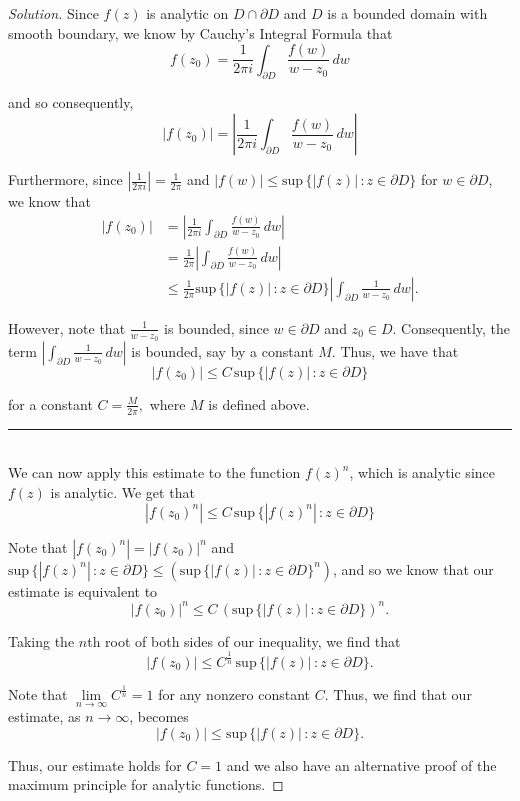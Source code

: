 \documentclass[11pt]{article}
\newenvironment{solution}
  {\renewcommand\qedsymbol{$\blacksquare$}\begin{proof}[Solution]}
  {\end{proof}}
\theoremstyle{definition}
\begin{document}
\begin{solution}
Since $f(z)$ is analytic on $D \cap \partial D$ and $D$ is a bounded domain with smooth boundary, we know by Cauchy's Integral Formula that
\[ f(z_0) = \frac{1}{2\pi i} \int_{\partial D} \frac{f(w)}{w-z_0} \, dw\]

and so consequently, 
\[ |f(z_0)| = \left|\frac{1}{2\pi i} \int_{\partial D} \frac{f(w)}{w-z_0} \, dw \right| \]

Furthermore, since $\left| \frac{1}{2\pi i} \right| = \frac{1}{2\pi}$ and $|f(w)| \leq \mathrm{sup} \, \{|f(z)| \, : z \in \partial D\}$ for $w \in \partial D$, we know that
\begin{align*} |f(z_0)| &= \left|\frac{1}{2\pi i} \int_{\partial D} \frac{f(w)}{w-z_0} \, dw \right| \\
&= \frac{1}{2\pi} \left|\int_{\partial D} \frac{f(w)}{w-z_0} \, dw \right| \\
&\leq \frac{1}{2\pi} \mathrm{sup} \, \{|f(z)| \, : z \in \partial D\} \left|\int_{\partial D} \frac{1}{w-z_0} \, dw \right|. \end{align*}

However, note that $\frac{1}{w-z_0}$ is bounded, since $w \in \partial D$ and $z_0 \in D$. Consequently, the term $\left|\int_{\partial D} \frac{1}{w-z_0} \, dw \right|$ is bounded, say by a constant $M$. 
Thus, we have that
\[ |f(z_0)| \leq C \, \mathrm{sup} \, \{|f(z)| \, : z \in \partial D\} \]

for a constant $C = \frac{M}{2\pi},$ where $M$ is defined above.

\noindent\rule{\textwidth}{1pt} \\

We can now apply this estimate to the function $f(z)^n$, which is analytic since $f(z)$ is analytic. We get that
\[ |f(z_0)^n| \leq C \, \mathrm{sup} \, \{|f(z)^n| \, : z \in \partial D\} \]

Note that $|f(z_0)^n| = |f(z_0)|^n$ and $\mathrm{sup} \, \{|f(z)^n| \, : z \in \partial D\} \leq \left(\mathrm{sup} \, \{|f(z)| \, : z \in \partial D\}^n\right)$, and so we know that
our estimate is equivalent to
\[ |f(z_0)|^n \leq C \, \left(\mathrm{sup} \, \{|f(z)| \, : z \in \partial D\} \right)^n.\]

Taking the $n$th root of both sides of our inequality, we find that
\[ |f(z_0)| \leq C^{\frac{1}{n}} \, \mathrm{sup} \, \{|f(z)| \, : z \in \partial D\}. \]

Note that $\lim\limits_{n \rightarrow \infty} C^{\frac{1}{n}} = 1$ for any nonzero constant $C$. Thus, we find that our estimate, as $n \rightarrow \infty$, becomes
\[|f(z_0)| \leq  \mathrm{sup} \, \{|f(z)| \, : z \in \partial D\}.\]

Thus, our estimate holds for $C=1$ and we also have an alternative proof of the maximum principle for analytic functions.
\end{solution}
\end{document}
